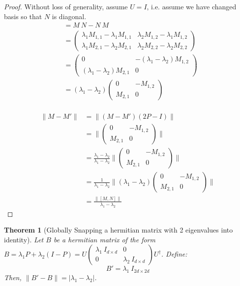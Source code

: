 \documentclass[11pt]{article}
\theoremstyle{plain}
\newtheorem{theorem}{Theorem}[section]
\begin{document}
\begin{proof}
Without loss of generality, assume $U = I$, i.e. assume we have changed basis so that $N$ is diagonal.
\begin{align*}
[M, N] &= M\ N - N\ M\\
&= \begin{pmatrix} \lambda_1 M_{1,1} - \lambda_1 M_{1,1} & \lambda_2 M_{1,2} - \lambda_1 M_{1,2} \\ \lambda_1 M_{2,1} - \lambda_2 M_{2,1} & \lambda_2 M_{2,2} - \lambda_2 M_{2,2}
\end{pmatrix}\\
&= \begin{pmatrix} 0 & - \left(\lambda_1 - \lambda_2\right) M_{1,2} \\ \left(\lambda_1 - \lambda_2\right) M_{2,1} & 0
\end{pmatrix}\\
&= \left(\lambda_1 - \lambda_2\right)\begin{pmatrix} 0 & - M_{1,2} \\  M_{2,1} & 0
\end{pmatrix}\\
\end{align*}

\begin{align*}
\|M - M' \| &= \| (M - M')(2P - I)\|\\
&= \|\begin{pmatrix}
            0 & -M_{1,2}\\
            M_{2,1} & 0
        \end{pmatrix} \|\\
&= \frac{\lambda_1 - \lambda_2}{\lambda_1 - \lambda_2}\|\begin{pmatrix}
            0 & -M_{1,2}\\
            M_{2,1} & 0
        \end{pmatrix} \|\\  
&= \frac{1}{\lambda_1 - \lambda_2}\|(\lambda_1 - \lambda_2)\begin{pmatrix}
            0 & -M_{1,2}\\
            M_{2,1} & 0
        \end{pmatrix} \|\\
&= \frac{\|[M, N]\|}{\lambda_1 - \lambda_2}
\end{align*}

\end{proof}


\begin{theorem}[Globally Snapping a hermitian matrix with 2 eigenvalues into identity]
\label{lemma:snapping-hermitian-qubit-hermitian-operator}
Let $B$ be a hermitian matrix of the form $B = \lambda_1 P + \lambda_2 (I - P) = U \begin{pmatrix}
        \lambda_1\: I_{d \times d} & 0\\ 0 & \lambda_2\: I_{d \times d}
    \end{pmatrix} U^\dagger$. Define:
    \begin{equation}
    B' = \lambda_1\: I_{2d \times 2d}
    \end{equation}
Then, $\|B' - B \| = |\lambda_1 - \lambda_2|$.
\end{theorem}
\end{document}
